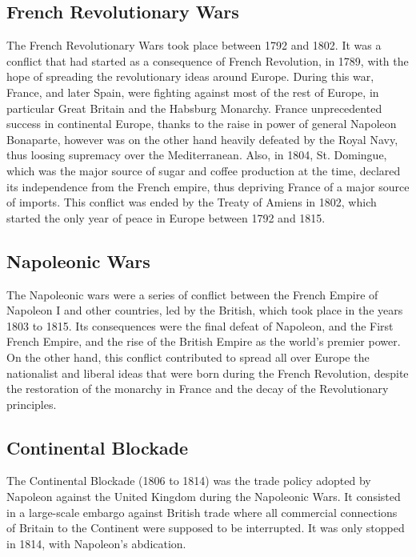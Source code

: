 \documentclass[12pt,a4paper,notitlepage,english]{article}
\begin{document}
\subsection{French Revolutionary Wars}
The French Revolutionary Wars took place between 1792 and 1802. It was a conflict that had started as a consequence of French Revolution, in 1789, with the hope of spreading the revolutionary ideas around Europe. During this war, France, and later Spain, were fighting against most of the rest of Europe, in particular Great Britain and the Habsburg Monarchy. France unprecedented success in continental Europe, thanks to the raise in power of general Napoleon Bonaparte, however was on the other hand heavily defeated by the Royal Navy, thus loosing supremacy over the Mediterranean. Also, in 1804, St. Domingue, which was the major source of sugar and coffee production at the time, declared its independence from the French empire, thus depriving France of a major source of imports. This conflict was ended by the Treaty of Amiens in 1802, which started the only year of peace in Europe between 1792 and 1815.

\subsection{Napoleonic Wars}
The Napoleonic wars were a series of conflict between the French Empire of Napoleon I and  other countries, led by the British, which took place in the years 1803 to 1815. Its consequences were the final defeat of Napoleon, and the First French Empire, and the rise of the British Empire as the world's premier power. On the other hand, this conflict contributed to spread all over Europe the nationalist and liberal ideas that were born during the French Revolution, despite the restoration of the monarchy in France and the decay of the Revolutionary principles. 

\subsection{Continental Blockade}
The Continental Blockade (1806 to 1814) was the trade policy adopted by Napoleon against the United Kingdom during the Napoleonic Wars. It consisted in a large-scale embargo against British trade where all commercial connections of Britain to the Continent were supposed to be interrupted. It was only stopped in 1814, with Napoleon's abdication. 
\end{document}
